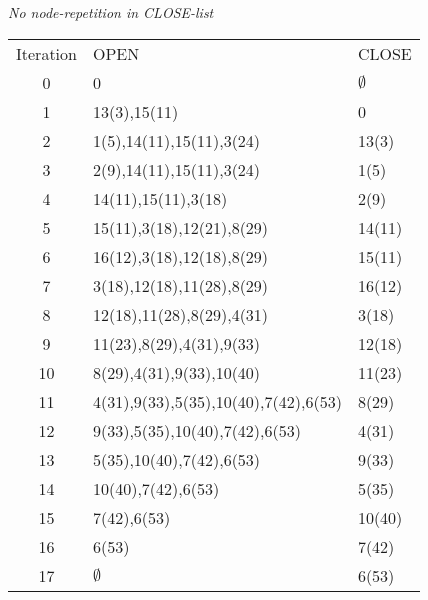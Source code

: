 \documentclass[11pt]{article}
\begin{document}
\emph{No node-repetition in CLOSE-list\\}
\begin{tabular}{ c | l | l }
  Iteration & OPEN & CLOSE \\
  0 	&	0 										& 	$\emptyset$ \\
  1		&	13(3),15(11)							&	0			\\
  2		&	1(5),14(11),15(11),3(24)				&	13(3)		\\
  3		&	2(9),14(11),15(11),3(24)				&	1(5)		\\
  4		&	14(11),15(11),3(18)						&	2(9)		\\
  5		&	15(11),3(18),12(21),8(29)				&	14(11)		\\
  6		&	16(12),3(18),12(18),8(29)				&	15(11)		\\
  7		&	3(18),12(18),11(28),8(29)				&	16(12)		\\
  8		&	12(18),11(28),8(29),4(31)				&	3(18)		\\
  9		&	11(23),8(29),4(31),9(33)				&	12(18)		\\
  10	&	8(29),4(31),9(33),10(40)				&	11(23)		\\
  11	&	4(31),9(33),5(35),10(40),7(42),6(53)	&	8(29)		\\
  12	&	9(33),5(35),10(40),7(42),6(53)			&	4(31)		\\
  13	&	5(35),10(40),7(42),6(53)				&	9(33)		\\
  14	&	10(40),7(42),6(53)						&	5(35)		\\
  15	&	7(42),6(53)								&	10(40)		\\
  16	&	6(53)									&	7(42)		\\
  17	&	$\emptyset$								&	6(53)
 \end{tabular}
\end{document}
